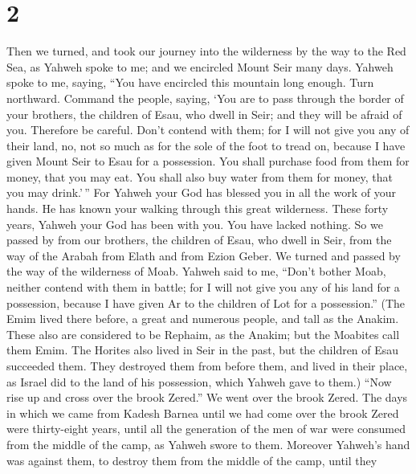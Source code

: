 \hypertarget{section-1}{%
\section{2}\label{section-1}}

 Then we turned, and took our journey into the wilderness
by the way to the Red Sea, as Yahweh spoke to me; and we encircled Mount
Seir many days.  Yahweh spoke to me, saying,
 ``You have encircled this mountain long enough. Turn
northward.  Command the people, saying, `You are to pass
through the border of your brothers, the children of Esau, who dwell in
Seir; and they will be afraid of you. Therefore be careful.
 Don't contend with them; for I will not give you any of
their land, no, not so much as for the sole of the foot to tread on,
because I have given Mount Seir to Esau for a possession. 
You shall purchase food from them for money, that you may eat. You shall
also buy water from them for money, that you may drink.'\,''
 For Yahweh your God has blessed you in all the work of
your hands. He has known your walking through this great wilderness.
These forty years, Yahweh your God has been with you. You have lacked
nothing.  So we passed by from our brothers, the children
of Esau, who dwell in Seir, from the way of the Arabah from Elath and
from Ezion Geber. We turned and passed by the way of the wilderness of
Moab.  Yahweh said to me, ``Don't bother Moab, neither
contend with them in battle; for I will not give you any of his land for
a possession, because I have given Ar to the children of Lot for a
possession.''  (The Emim lived there before, a great and
numerous people, and tall as the Anakim.  These also are
considered to be Rephaim, as the Anakim; but the Moabites call them
Emim.  The Horites also lived in Seir in the past, but
the children of Esau succeeded them. They destroyed them from before
them, and lived in their place, as Israel did to the land of his
possession, which Yahweh gave to them.)  ``Now rise up
and cross over the brook Zered.'' We went over the brook Zered.
 The days in which we came from Kadesh Barnea until we
had come over the brook Zered were thirty-eight years, until all the
generation of the men of war were consumed from the middle of the camp,
as Yahweh swore to them.  Moreover Yahweh's hand was
against them, to destroy them from the middle of the camp, until they

